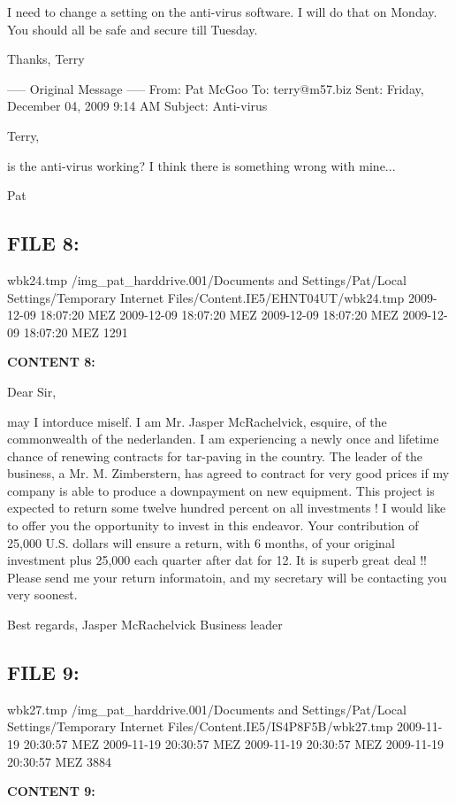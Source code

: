 I need to change a setting on the anti-virus software.  I will do that on 
Monday.  You should all be safe and secure till Tuesday.

Thanks,
Terry

----- Original Message -----
From: Pat McGoo
To: terry@m57.biz
Sent: Friday, December 04, 2009 9:14 AM
Subject: Anti-virus

Terry,

is the anti-virus working?  I think there is something wrong with
mine...

Pat

\subsection{FILE 8:}
wbk24.tmp	/img_pat_harddrive.001/Documents and Settings/Pat/Local Settings/Temporary Internet Files/Content.IE5/EHNT04UT/wbk24.tmp		2009-12-09 18:07:20 MEZ	2009-12-09 18:07:20 MEZ	2009-12-09 18:07:20 MEZ	2009-12-09 18:07:20 MEZ	1291	

\textbf{CONTENT 8:}

Dear Sir,

may I intorduce miself.  I am Mr. Jasper McRachelvick, esquire, of the 
commonwealth of the nederlanden.  I am experiencing a newly once and 
lifetime chance of renewing contracts for tar-paving in the country.  The 
leader of the business, a Mr. M. Zimberstern, has agreed to contract for 
very good prices if my company is able to produce a downpayment on new 
equipment.  This project is expected to return some twelve hundred percent 
on all investments !  I would like to offer you the opportunity to invest 
in this endeavor.  Your contribution of 25,000 U.S. dollars will ensure a 
return, with 6 months, of your original investment plus 25,000 each quarter 
after dat for 12.  It is superb great deal !!  Please send me your return 
informatoin, and my secretary will be contacting you very soonest.

Best regards,
Jasper McRachelvick
Business leader


\subsection{FILE 9:}
wbk27.tmp	/img_pat_harddrive.001/Documents and Settings/Pat/Local Settings/Temporary Internet Files/Content.IE5/IS4P8F5B/wbk27.tmp		2009-11-19 20:30:57 MEZ	2009-11-19 20:30:57 MEZ	2009-11-19 20:30:57 MEZ	2009-11-19 20:30:57 MEZ	3884	

\textbf{CONTENT 9:}

